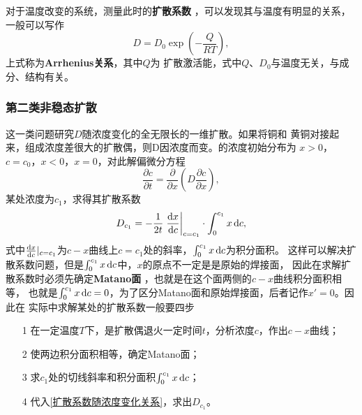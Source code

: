                 对于温度改变的系统，测量此时的\textbf{扩散系数} ，可以发现其与温度有明显的关系，一般可以写作
                \begin{equation}
                    D=D_0\exp\left( -\frac{Q}{RT} \right),
                \end{equation}
                上式称为\textbf{Arrhenius关系}，其中$Q$为
                扩散激活能，式中$Q$、$D_0$与温度无关，与成分、结构有关。
            \subsubsection{第二类非稳态扩散}
                这一类问题研究$D$随浓度变化的全无限长的一维扩散。如果将铜和
                黄铜对接起来，组成浓度差很大的扩散偶，则D因浓度而变。的浓度初始分布为
                $x>0$，$c=c_0$，$x<0$，$x=0$，对此解偏微分方程
                \begin{equation}
                    \frac{\partial c}{\partial t}=\frac{\partial }{\partial x}\left( D\frac{\partial c}{\partial x} \right),
                \end{equation}
                某处浓度为$c_1$，求得其扩散系数
                \begin{equation}
                    D_{c_1}=-\frac{1}{2t}\left.\frac{\mathop{}\!\mathrm{d} x}{\mathop{}\!\mathrm{d} c}\right\vert_{c=c_1}\cdot\int_{0}^{c_1}x\mathop{}\!\mathrm{d} c\label{扩散系数随浓度变化关系},
                \end{equation}
                式中$\frac{\mathop{}\!\mathrm{d} x}{\mathop{}\!\mathrm{d} c}\vert_{c=c_1}$为$c-x$曲线上$c=c_1$处的斜率，$\int_{0}^{c_1}x\mathop{}\!\mathrm{d} c$为积分面积。
                这样可以解决扩散系数问题，但是$\int_{0}^{c_1}x\mathop{}\!\mathrm{d} c$中，$x$的原点不一定是是原始的焊接面，
                因此在求解扩散系数时必须先确定\textbf{Matano面} ，也就是在这个面两侧的$c-x$曲线积分面积相等，
                也就是$\int_{0}^{c_1}x\mathop{}\!\mathrm{d} c=0$，为了区分Matano面和原始焊接面，后者记作$x'=0$。因此在
                实际中求解某处的扩散系数一般要四步
                \begin{itemize}
                    \item[1] 在一定温度$T$下，是扩散偶退火一定时间$t$，分析浓度$c$，作出$c-x$曲线；
                    \item[2] 使两边积分面积相等，确定Matano面；
                    \item[3] 求$c_1$处的切线斜率和积分面积$\int_{0}^{c_1}x\mathop{}\!\mathrm{d} c$；
                    \item[4] 代入\autoref{扩散系数随浓度变化关系}，求出$D_{c_1}$。
                \end{itemize}


